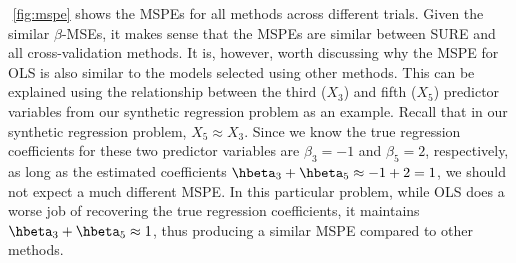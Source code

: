 $ $\newline
\cref{fig:mspe} shows the MSPEs for all methods across different trials. Given the similar $\beta$-MSEs, it makes sense that the MSPEs are similar between SURE and all cross-validation methods. It is, however, worth discussing why the MSPE for OLS is also similar to the models selected using other methods. This can be explained using the relationship between the third ($X_3$) and fifth ($X_5$) predictor variables from our synthetic regression problem as an example. Recall that in our synthetic regression problem, $X_5\approx X_3$. Since we know the true regression coefficients for these two predictor variables are $\beta_3=-1$ and $\beta_5=2$, respectively, as long as the estimated coefficients $\hbeta_3 + \hbeta_5 \approx -1+2=1$, we should not expect a much different MSPE. In this particular problem, while OLS does a worse job of recovering the true regression coefficients, it maintains $\hbeta_3 + \hbeta_5 \approx 1$, thus producing a similar MSPE compared to other methods.

